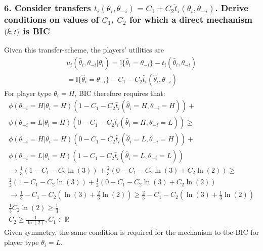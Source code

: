 \documentclass[a4paper]{article}
\begin{document}
	\subsubsection*{6. Consider transfers $t_{i}(\theta_{i},\theta_{-i})=C_{1}+C_{2}\hat{t}_{i}(\theta_{i},\theta_{-i})$. Derive conditions on values of $C_{1}$, $C_{2}$ for which a direct mechanism $(\Tilde{k},t)$ is BIC}
	Given this transfer-scheme, the players' utilities are
	\begin{align}
		u_{i}(\hat{\theta}_{i}, \theta_{-i}|\theta_{i})=\mathbb{I}\{\hat{\theta}_{i}=\theta_{-i}\}-t_{i}(\hat{\theta}_{i},\theta_{-i}) \nonumber\\
		=\mathbb{I}\{\hat{\theta}_{i}=\theta_{-i}\}-C_{1}-C_{2}\hat{t}_{i}(\hat{\theta}_{i},\theta_{-i})
	\end{align}
	For player type $\theta_{i}=H$, BIC therefore requires that:
	\begin{align}
		\phi(\theta_{-i}=H|\theta_{i}=H)(1-C_{1}-C_{2}\hat{t}_{i}(\hat{\theta}_{i}=H,\theta_{-i}=H))+\nonumber\\
		\phi(\theta_{-i}=L|\theta_{i}=H)(0-C_{1}-C_{2}\hat{t}_{i}(\hat{\theta}_{i}=H,\theta_{-i}=L)) \geq \nonumber\\ \phi(\theta_{-i}=H|\theta_{i}=H)(0-C_{1}-C_{2}\hat{t}_{i}(\hat{\theta}_{i}=L,\theta_{-i}=H)) + \nonumber\\ \phi(\theta_{-i}=L|\theta_{i}=H)(1-C_{1}-C_{2}\hat{t}_{i}(\hat{\theta}_{i}=L,\theta_{-i}=L))
		\\
		\rightarrow 
		\frac{1}{3}(1-C_{1}-C_{2}\ln(3))+\frac{2}{3}(0-C_{1}-C_{2}\ln(3)+C_{2}\ln(2)) \geq \nonumber\\ 
		\frac{2}{3}(1-C_{1}-C_{2}\ln(3)) + \frac{1}{3}(0-C_{1}-C_{2}\ln(3)+C_{2}\ln(2))
		\\
		\rightarrow
		\frac{1}{3}-C_{1}-C_{2}\left(\ln(3)+\frac{2}{3}\ln(2)\right) \geq  \frac{2}{3}-C_{1}-C_{2}\left(\ln(3)+\frac{1}{3}\ln(2)\right)
		\\
		\frac{1}{3}C_{2}\ln(2) \geq \frac{1}{3}\\
		C_{2}\geq \frac{1}{\ln(2)}, C_{1}\in\mathbb{R}
	\end{align}
	Given symmetry, the same condition is required for the mechanism to tbe BIC for player type $\theta_{i}=L$.
	
	
\end{document}
